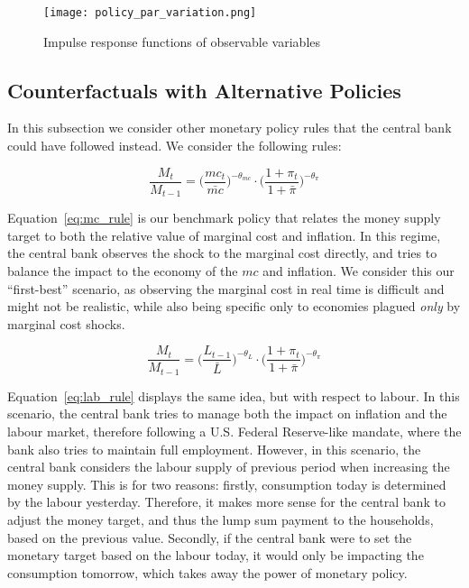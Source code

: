 \documentclass[12pt]{article}
\begin{document}
\begin{figure}[!h]
    \caption{Impulse response functions of observable variables}\label{fig:policy_par_variation}
    \centering
    \texttt{[image: policy\_par\_variation.png]}
\end{figure}


\subsection*{Counterfactuals with Alternative Policies}

In this subsection we consider other monetary policy rules that the central bank could have followed instead. We consider the following rules:

\begin{equation}\label{eq:mc_rule}
    \frac{M_t}{M_{t-1}}
          = \Big(\frac{mc_t}{\bar{mc}}\Big)^{-\theta_{mc}}
            \cdot \Big(\frac{1 + \pi_t}{1 + \bar{\pi}}\Big)^{-\theta_{\pi}}
\end{equation}

Equation~\ref{eq:mc_rule} is our benchmark policy that relates the money supply target to both the relative value of marginal cost and inflation. In this regime, the central bank observes the shock to the marginal cost directly, and tries to balance the impact to the economy of the $mc$ and inflation. We consider this our ``first-best'' scenario, as observing the marginal cost in real time is difficult and might not be realistic, while also being specific only to economies plagued \textit{only} by marginal cost shocks.

\begin{equation}\label{eq:lab_rule}
    \frac{M_t}{M_{t-1}}
        = \Big(\frac{L_{t-1}}{\bar{L}}\Big)^{-\theta_L}
          \cdot \Big(\frac{1 + \pi_t}{1 + \bar{\pi}}\Big)^{-\theta_{\pi}}
\end{equation}

Equation~\ref{eq:lab_rule} displays the same idea, but with respect to labour. In this scenario, the central bank tries to manage both the impact on inflation and the labour market, therefore following a U.S. Federal Reserve-like mandate, where the bank also tries to maintain full employment. However, in this scenario, the central bank considers the labour supply of previous period when increasing the money supply. This is for two reasons: firstly, consumption today is determined by the labour yesterday. Therefore, it makes more sense for the central bank to adjust the money target, and thus the lump sum payment to the households, based on the previous value. Secondly, if the central bank were to set the monetary target based on the labour today, it would only be impacting the consumption tomorrow, which takes away the power of monetary policy.  
\end{document}

